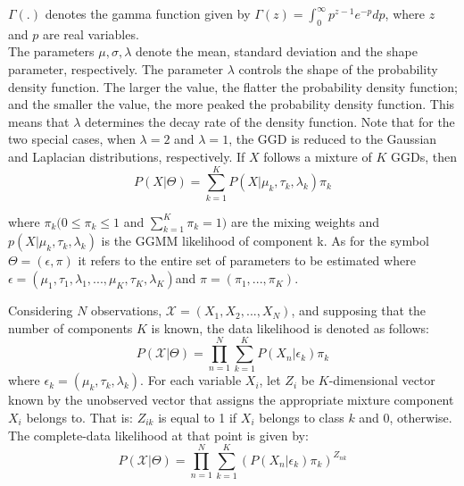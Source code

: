 \documentclass[conference]{IEEEtran}
\begin{document}
$\Gamma(.)$ denotes the gamma function given by $\Gamma(z) = \int_{0}^{\infty}p^{z-1}e^{-p} dp$, where $z$ and $p$ are real variables.\\
The parameters $\mu, \sigma, \lambda$  denote the mean, standard deviation and the shape parameter, respectively. The parameter $\lambda$ controls the shape of the probability density function.
The larger the value, the flatter the probability density function; and the smaller the value, the more peaked the probability density function. This means that $\lambda$ determines the decay rate of the density function. 
Note that for the two special cases, when $\lambda = 2$ and $\lambda = 1$, the GGD is reduced to the Gaussian and Laplacian distributions, respectively.
If $X$ follows a mixture of $K$ GGDs, then 
\begin{equation}
    P(X|\Theta) = \sum_{k = 1}^{K} P(X|\mu_k, \tau_k, \lambda_k)\pi_k
\end{equation}


where $\pi_k(0\leq\pi_k\leq1$ and $\sum_{k=1}^{K} \pi_k = 1)$ are the mixing weights and $p(X|\mu_k, \tau_k, \lambda_k)$ is the GGMM likelihood of component k. 
As for the symbol $\Theta = (\epsilon, \pi)$ it refers to the entire set of parameters to be estimated where $\epsilon = (\mu_1, \tau_1, \lambda_1, ..., \mu_K, \tau_K, \lambda_K)$and $\pi=(\pi_1,...,\pi_K)$. 

Considering $N$ observations,  $\mathcal{X} = (X_1, X_2, ..., X_N)$, and supposing that the number of components $K$ is known, the data likelihood is denoted as follows:
\begin{equation}
    P(\mathcal{X}|\Theta) = \prod_{n = 1}^{N}\sum_{k=1}^{K} P(X_n|\epsilon_k)\pi_k
\end{equation}
where $\epsilon_k = (\mu_k, \tau_k, \lambda_k)$. 
For each variable $X_i$, let $Z_i$  be $K$-dimensional vector known by the unobserved vector that assigns the appropriate mixture component $X_i$ belongs to. That is: $Z_{ik}$ is equal to 1 if $X_i$ belongs to class $k$ and 0, otherwise. The complete-data likelihood at that point is given by:
\begin{equation}
    P(\mathcal{X}|\Theta) = \prod_{n = 1}^{N}\sum_{k=1}^{K} (P(X_n|\epsilon_k)\pi_k)^{Z_{nk}}
\end{equation}
\end{document}
